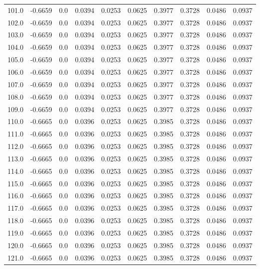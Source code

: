 \begin{longtable}{lrrrrrrrrr}
101.0 & -0.6659 & 0.0 & 0.0394 & 0.0253 & 0.0625 & 0.3977 & 0.3728 & 0.0486 & 0.0937 \\
102.0 & -0.6659 & 0.0 & 0.0394 & 0.0253 & 0.0625 & 0.3977 & 0.3728 & 0.0486 & 0.0937 \\
103.0 & -0.6659 & 0.0 & 0.0394 & 0.0253 & 0.0625 & 0.3977 & 0.3728 & 0.0486 & 0.0937 \\
104.0 & -0.6659 & 0.0 & 0.0394 & 0.0253 & 0.0625 & 0.3977 & 0.3728 & 0.0486 & 0.0937 \\
105.0 & -0.6659 & 0.0 & 0.0394 & 0.0253 & 0.0625 & 0.3977 & 0.3728 & 0.0486 & 0.0937 \\
106.0 & -0.6659 & 0.0 & 0.0394 & 0.0253 & 0.0625 & 0.3977 & 0.3728 & 0.0486 & 0.0937 \\
107.0 & -0.6659 & 0.0 & 0.0394 & 0.0253 & 0.0625 & 0.3977 & 0.3728 & 0.0486 & 0.0937 \\
108.0 & -0.6659 & 0.0 & 0.0394 & 0.0253 & 0.0625 & 0.3977 & 0.3728 & 0.0486 & 0.0937 \\
109.0 & -0.6659 & 0.0 & 0.0394 & 0.0253 & 0.0625 & 0.3977 & 0.3728 & 0.0486 & 0.0937 \\
110.0 & -0.6665 & 0.0 & 0.0396 & 0.0253 & 0.0625 & 0.3985 & 0.3728 & 0.0486 & 0.0937 \\
111.0 & -0.6665 & 0.0 & 0.0396 & 0.0253 & 0.0625 & 0.3985 & 0.3728 & 0.0486 & 0.0937 \\
112.0 & -0.6665 & 0.0 & 0.0396 & 0.0253 & 0.0625 & 0.3985 & 0.3728 & 0.0486 & 0.0937 \\
113.0 & -0.6665 & 0.0 & 0.0396 & 0.0253 & 0.0625 & 0.3985 & 0.3728 & 0.0486 & 0.0937 \\
114.0 & -0.6665 & 0.0 & 0.0396 & 0.0253 & 0.0625 & 0.3985 & 0.3728 & 0.0486 & 0.0937 \\
115.0 & -0.6665 & 0.0 & 0.0396 & 0.0253 & 0.0625 & 0.3985 & 0.3728 & 0.0486 & 0.0937 \\
116.0 & -0.6665 & 0.0 & 0.0396 & 0.0253 & 0.0625 & 0.3985 & 0.3728 & 0.0486 & 0.0937 \\
117.0 & -0.6665 & 0.0 & 0.0396 & 0.0253 & 0.0625 & 0.3985 & 0.3728 & 0.0486 & 0.0937 \\
118.0 & -0.6665 & 0.0 & 0.0396 & 0.0253 & 0.0625 & 0.3985 & 0.3728 & 0.0486 & 0.0937 \\
119.0 & -0.6665 & 0.0 & 0.0396 & 0.0253 & 0.0625 & 0.3985 & 0.3728 & 0.0486 & 0.0937 \\
120.0 & -0.6665 & 0.0 & 0.0396 & 0.0253 & 0.0625 & 0.3985 & 0.3728 & 0.0486 & 0.0937 \\
121.0 & -0.6665 & 0.0 & 0.0396 & 0.0253 & 0.0625 & 0.3985 & 0.3728 & 0.0486 & 0.0937 \\

\end{longtable}
